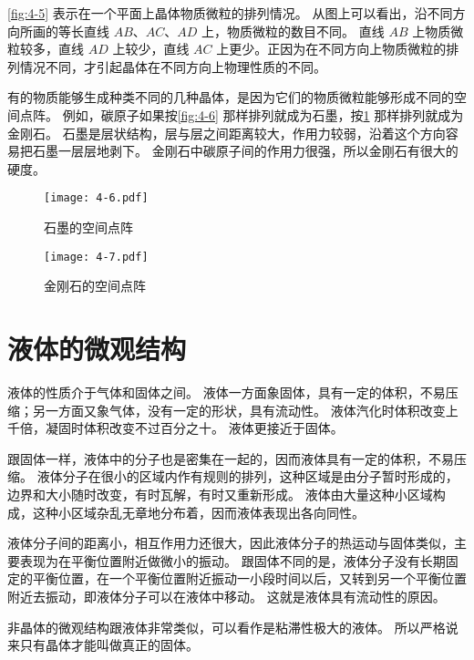 \cref{fig:4-5} 表示在一个平面上晶体物质微粒的排列情况。
从图上可以看出，沿不同方向所画的等长直线 $AB$、$AC$、$AD$ 上，物质微粒的数目不同。
直线 $AB$ 上物质微粒较多，直线 $AD$ 上较少，直线 $AC$ 上更少。正因为在不同方向上物质微粒的排列情况不同，才引起晶体在不同方向上物理性质的不同。

有的物质能够生成种类不同的几种晶体，是因为它们的物质微粒能够形成不同的空间点阵。
例如，碳原子如果按\cref{fig:4-6} 那样排列就成为石墨，按\cref{fig:4-7} 那样排列就成为金刚石。
石墨是层状结构，层与层之间距离较大，作用力较弱，沿着这个方向容易把石墨一层层地剥下。
金刚石中碳原子间的作用力很强，所以金刚石有很大的硬度。
\begin{figure}
	\begin{minipage}[b]{0.48\linewidth}
		\centering
\texttt{[image: 4-6.pdf]}
\caption{石墨的空间点阵}\label{fig:4-6}
	\end{minipage}
	\begin{minipage}[b]{0.48\linewidth}
		\centering
\texttt{[image: 4-7.pdf]}
\caption{金刚石的空间点阵}\label{fig:4-7}
	\end{minipage}
\end{figure}

\section{液体的微观结构}
液体的性质介于气体和固体之间。
液体一方面象固体，具有一定的体积，不易压缩；另一方面又象气体，没有一定的形状，具有流动性。
液体汽化时体积改变上千倍，凝固时体积改变不过百分之十。
液体更接近于固体。

跟固体一样，液体中的分子也是密集在一起的，因而液体具有一定的体积，不易压缩。
液体分子在很小的区域内作有规则的排列，这种区域是由分子暂时形成的，边界和大小随时改变，有时瓦解，有时又重新形成。
液体由大量这种小区域构成，这种小区域杂乱无章地分布着，因而液体表现出各向同性。

液体分子间的距离小，相互作用力还很大，因此液体分子的热运动与固体类似，主要表现为在平衡位置附近做微小的振动。
跟固体不同的是，液体分子没有长期固定的平衡位置，在一个平衡位置附近振动一小段时间以后，又转到另一个平衡位置附近去振动，即液体分子可以在液体中移动。
这就是液体具有流动性的原因。

非晶体的微观结构跟液体非常类似，可以看作是粘滞性极大的液体。
所以严格说来只有晶体才能叫做真正的固体。

